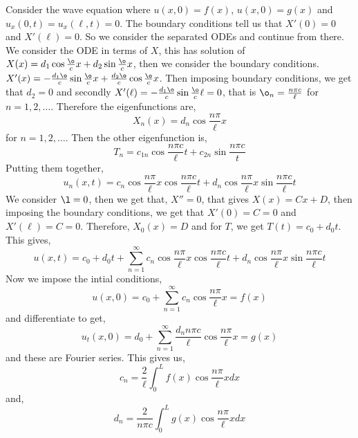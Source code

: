 \begin{eg}
  Consider the wave equation where $u(x, 0) = f(x)$, $u(x, 0) = g(x)$ and $u_x(0, t) = u_x(\ell, t) = 0$. The boundary conditions tell us that $X'(0) = 0$ and $X'(\ell) = 0$. So we consider the separated ODEs and continue from there. We consider the ODE in terms of $X$, this has solution of $X(x) = d_1\cos \frac{\o}{c}x + d_2\sin \frac{\o}{c}x$, then we consider the boundary conditions. $X'(x) = -\frac{d_1\o}{c} \sin \frac{\o}{c}x + \frac{d_2\o}{c}\cos \frac{\o}{c}x$. Then imposing boundary conditions,
  we get that $d_2 = 0$ and secondly $X'(\ell) = -\frac{d_1\o}{c}\sin \frac{\o}{c}\ell = 0$, that is $\o_n = \frac{n\pi c}{\ell}$ for $n = 1, 2, \dots$. Therefore the eigenfunctions are,
  $$X_n(x) = d_n\cos \frac{n\pi }{\ell} x$$
  for $n = 1, 2, \dots$. Then the other eigenfunction is,
  $$ T_n = c_{1n}\cos \frac{n\pi c}{\ell}t + c_{2n}\sin \frac{n\pi c}{t} $$
  Putting them together,
  $$ u_n(x, t) = c_n\cos \frac{n\pi}{\ell}x \cos \frac{n\pi c}{\ell} t + d_n \cos \frac{n\pi }{\ell} x \sin \frac{n\pi c}{\ell}t $$
  We consider $\l = 0$, then we get that, $X'' = 0$, that gives $X(x) = Cx + D$, then imposing the boundary conditions, we get that $X'(0) = C = 0$ and $X'(\ell) = C = 0$. Therefore, $X_0(x) = D$ and for $T$, we get $T(t) = c_0 + d_0t$. This gives,
  $$ u(x, t) = c_0 + d_0t + \sum_{n=1}^\infty c_n\cos \frac{n\pi}{\ell}x \cos \frac{n\pi c}{\ell} t + d_n \cos \frac{n\pi }{\ell} x \sin \frac{n\pi c}{\ell}t $$
  Now we impose the intial conditions,
  $$ u(x, 0) = c_0 + \sum_{n=1}^\infty c_n\cos \frac{n\pi}{\ell} x = f(x)$$
  and differentiate to get,
  $$ u_t(x, 0) = d_0 + \sum_{n=1}^\infty \frac{d_n n\pi c}{\ell} \cos \frac{n\pi}{\ell}x = g(x) $$
  and these are Fourier series. This gives us,
  $$ c_n = \frac{2}{\ell}\int_0^L f(x)\cos \frac{n\pi }{\ell} x dx $$
  and,
  $$ d_n = \frac{2}{n\pi c}\int_0^L g(x)\cos \frac{n\pi }{\ell}x dx $$
\end{eg}


